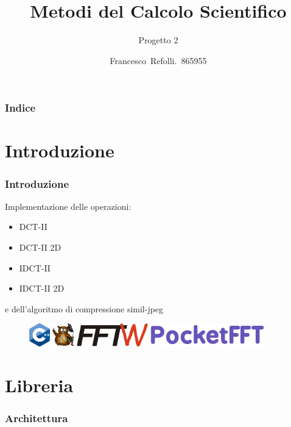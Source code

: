 \documentclass{beamer}
\title{Metodi del Calcolo Scientifico}
\subtitle{Progetto 2}
\author{Francesco~Refolli.~865955}
\begin{document}
\frame{\titlepage}

\begin{frame}
\frametitle{Indice}
\tableofcontents
\end{frame}

\section{Introduzione}

\begin{frame}
\frametitle{Introduzione}

Implementazione delle operazioni:
\begin{itemize}
  \item DCT-II
  \item DCT-II 2D
  \item IDCT-II
  \item IDCT-II 2D
\end{itemize}

e dell'algoritmo di compressione simil-jpeg

\begin{figure}
  \centering
  \includegraphics[height=1cm]{images/cpp.png}
  \hspace{0.5cm}
  \includegraphics[height=1cm]{images/eigen.png}
  \hspace{0.5cm}
  \includegraphics[height=1cm]{images/fftw.png}
  \hspace{0.5cm}
  \includegraphics[height=1cm]{images/pocketfft.png}
\end{figure}

\end{frame}

\section{Libreria}

\begin{frame}
\frametitle{Architettura}
\end{frame}
\end{document}
